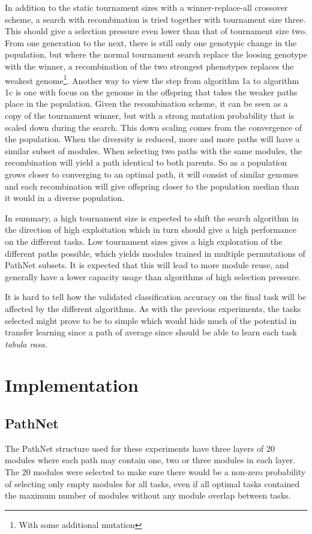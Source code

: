 In addition to the static tournament sizes with a winner-replace-all crossover scheme, a search with recombination is tried together with tournament size three.  This should give a selection pressure even lower than that of tournament size two. From one generation to the next, there is still only one genotypic change in the population, but where the normal tournament search replace the loosing genotype with the winner, a recombination of the two strongest phenotypes replaces the weakest genome\footnote{With some additional mutation}.  Another way to view the step from algorithm 1a to algorithm 1c is one with focus on the genome in the offspring that takes the weaker paths place in the population. Given the recombination scheme, it can be seen as a copy of the tournament winner, but with a strong mutation probability that is scaled down during the search. This down scaling comes from the convergence of the population. When the diversity is reduced, more and more paths will have a similar subset of modules. When selecting two paths with the same modules, the recombination will yield a path identical to both parents. So as a population grows closer to converging to an optimal path, it will consist of similar genomes and each recombination will give offspring closer to the population median than it would in a diverse population. 


In summary, a high tournament size is expected to shift the search algorithm in the direction of high exploitation which in turn should give a high performance on the different tasks. Low tournament sizes gives a high exploration of the different paths possible, which yields modules trained in multiple permutations of PathNet subsets. It is expected that this will lead to more module reuse, and generally have a lower capacity usage than algorithms of high selection pressure. 

It is hard to tell how the validated classification accuracy on the final task will be affected by the different algorithms. As with the previous experiments, the tasks selected might prove to be to simple which would hide much of the potential in transfer learning since a path of average since should be able to learn each task \textit{tabula rasa}.

\section{Implementation}\label{exp2:implementation}
\subsection{PathNet}
The PathNet structure used for these experiments have three layers of 20 modules where each path may contain one, two or three modules in each layer. The 20 modules were selected to make sure there would be a non-zero probability of selecting only empty modules for all tasks, even if all optimal tasks contained the maximum number of modules without any module overlap between tasks.

